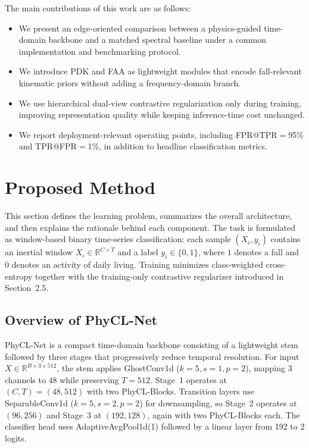 \documentclass[jec]{acnsart}
\begin{document}
The main contributions of this work are as follows:
\begin{itemize}
\item We present an edge-oriented comparison between a physics-guided time-domain backbone and a matched spectral baseline under a common implementation and benchmarking protocol.
\item We introduce PDK and FAA as lightweight modules that encode fall-relevant kinematic priors without adding a frequency-domain branch.
\item We use hierarchical dual-view contrastive regularization only during training, improving representation quality while keeping inference-time cost unchanged.
\item We report deployment-relevant operating points, including FPR@TPR${=}$95\% and TPR@FPR${=}$1\%, in addition to headline classification metrics.
\end{itemize}

\section{Proposed Method}

This section defines the learning problem, summarizes the overall architecture, and then explains the rationale behind each component. The task is formulated as window-based binary time-series classification: each sample $(X_i, y_i)$ contains an inertial window $X_i \in \mathbb{R}^{C \times T}$ and a label $y_i \in \{0,1\}$, where $1$ denotes a fall and $0$ denotes an activity of daily living. Training minimizes class-weighted cross-entropy together with the training-only contrastive regularizer introduced in Section~2.5.

\FloatBarrier
\subsection{Overview of PhyCL-Net}
PhyCL-Net is a compact time-domain backbone consisting of a lightweight stem followed by three stages that progressively reduce temporal resolution. For input $X \in \mathbb{R}^{B \times 3 \times 512}$, the stem applies GhostConv1d ($k{=}5, s{=}1, p{=}2$), mapping 3 channels to 48 while preserving $T{=}512$. Stage~1 operates at $(C,T){=}(48,512)$ with two PhyCL-Blocks. Transition layers use SeparableConv1d ($k{=}5, s{=}2, p{=}2$) for downsampling, so Stage~2 operates at $(96,256)$ and Stage~3 at $(192,128)$, again with two PhyCL-Blocks each. The classifier head uses AdaptiveAvgPool1d(1) followed by a linear layer from 192 to 2 logits.
\end{document}
